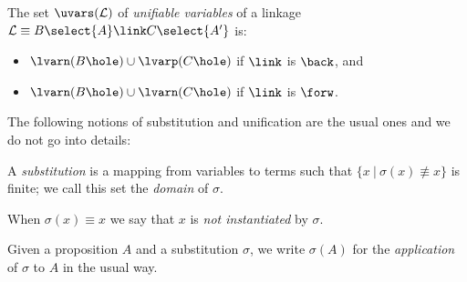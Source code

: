 \begin{definition}
\end{definition}


\begin{definition}\label{def:uvars}
  The set $\uvars(\mathcal{L})$ of {\em unifiable variables} of a linkage
  $\mathcal{L} \equiv B\select{A}\link C\select{A'}$ is:
  \begin{itemize}
  \item $\lvarn(B\hole)\cup\lvarp(C\hole)$ if $\link$ is $\back$, and
  \item $\lvarn(B\hole)\cup\lvarn(C\hole)$ if $\link$ is $\forw$.
  \end{itemize}
\end{definition}

The following notions of substitution and unification are the usual ones and we
do not go into details:
 
\begin{definition}[Substitution]
  A \emph{substitution} is a mapping from variables to terms such that $\{x ~|~
  \sigma(x)\not\equiv x\}$ is finite; we call this set the {\em domain} of $\sigma$.

  When $\sigma(x)\equiv x$ we say that $x$ is  {\em not instantiated} by
  $\sigma$.
  
  
  Given a proposition $A$ and a substitution $\sigma$, we write
  $\sigma(A)$ for the \emph{application} of $\sigma$ to $A$ in the usual way.
\end{definition}

